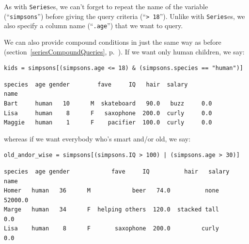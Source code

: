 As with \texttt{Series}es, we can't forget to repeat the name of the variable
(``\texttt{simpsons}'') before giving the query criteria (``\texttt{> 18}'').
Unlike with \texttt{Series}es, we also specify a column name
(``\texttt{.age}'') that we want to query.


We can also provide compound conditions in just the same way as before
(section~\ref{seriesCompoundQueries}, p.~\pageref{seriesCompoundQueries}). If
we want only human children, we say:

\begin{Verbatim}[fontsize=\CBCodeSmall,samepage=true,frame=single,framesep=3mm]
kids = simpsons[(simpsons.age <= 18) & (simpsons.species == "human")]
\end{Verbatim}
\vspace{-.2in}

\begin{Verbatim}[fontsize=\CBCodeSmall,samepage=true,frame=leftline,framesep=5mm,framerule=1mm]
       species  age gender        fave     IQ   hair  salary
name                                                        
Bart     human   10      M  skateboard   90.0   buzz     0.0
Lisa     human    8      F   saxophone  200.0  curly     0.0
Maggie   human    1      F    pacifier  100.0  curly     0.0
\end{Verbatim}

whereas if we want everybody who's smart and/or old, we say:

\begin{Verbatim}[fontsize=\CBCodeSmall,samepage=true,frame=single,framesep=3mm]
old_andor_wise = simpsons[(simpsons.IQ > 100) | (simpsons.age > 30)]
\end{Verbatim}
\vspace{-.2in}

\begin{Verbatim}[fontsize=\CBCodeSmall,samepage=true,frame=leftline,framesep=5mm,framerule=1mm]
      species  age gender            fave     IQ          hair   salary
name                                                                   
Homer   human   36      M            beer   74.0          none  52000.0
Marge   human   34      F  helping others  120.0  stacked tall      0.0
Lisa    human    8      F       saxophone  200.0         curly      0.0
\end{Verbatim}

